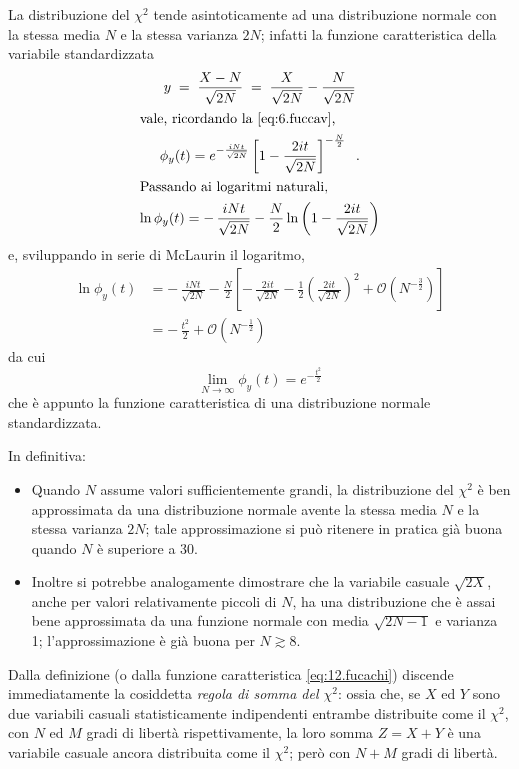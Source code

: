 %
La distribuzione del $\chi^2$ tende asintoticamente ad una
distribuzione normale con la stessa media $N$ e la stessa
varianza $2N$; infatti la funzione caratteristica della
variabile standardizzata
\begin{gather*}
  y \; = \; \frac{X - N}{\sqrt{2N}} \; = \;
    \frac{X}{\sqrt{2N}} - \frac{N}{\sqrt{2N}} \\
  \intertext{vale, ricordando la \eqref{eq:6.fuccav},}
  \phi_y(t) = e^{- \frac{i N t}{\sqrt{2N}}} \left[ 1 -
    \frac{2 i t}{\sqrt{2N}} \right]^{- \frac{N}{2}} \;\; . \\
  \intertext{Passando ai logaritmi naturali,}
  \ln \phi_y(t) = - \, \frac{i N t}{\sqrt{2N}} -
    \frac{N}{2} \ln \left( 1 - \frac{2 i t}{\sqrt{2N}}
    \right)
\end{gather*}
e, sviluppando in serie di McLaurin il logaritmo,
\begin{align*}
  \ln \phi_y(t) &= - \, \frac{i N t}{\sqrt{2N}} -
    \frac{N}{2} \left[ - \, \frac{2 i t}{\sqrt{2N}} -
    \frac{1}{2} \left( \frac{2 i t}{\sqrt{2N}}
    \right)^2 + \mathcal{O} \left( N^{-\frac{3}{2}} \right)
  \right] \\[1ex]
  &= - \, \frac{t^2}{2} + \mathcal{O} \left(
    N^{-\frac{1}{2}} \right)
\end{align*}
da cui
\begin{equation*}
  \lim_{N \to \infty} \phi_y(t) = e^{- \frac{t^2}{2}}
\end{equation*}
che \`e appunto la funzione caratteristica di una
distribuzione normale standardizzata.

In definitiva:
\begin{itemize}
\item Quando $N$ assume valori sufficientemente grandi, la
  distribuzione del $\chi^2$ \`e ben approssimata da una
  distribuzione normale avente la stessa media $N$ e la
  stessa varianza $2N$; tale approssimazione si pu\`o
  ritenere in pratica gi\`a buona quando $N$ \`e superiore a
  30.
\item Inoltre si potrebbe analogamente dimostrare che la
  variabile casuale $\sqrt{2 X}$, anche per valori
  relativamente piccoli di $N$, ha una distribuzione che \`e
  assai bene approssimata da una funzione normale con media
  $\sqrt{2N-1}$ e varianza 1; l'approssimazione \`e gi\`a
  buona per $N\gtrsim 8$.
\end{itemize}%

Dalla definizione (o dalla funzione caratteristica
\eqref{eq:12.fucachi}) discende immediatamente la cosiddetta
\emph{regola di somma del $\chi^2$}\label{th:12.resochi}:%
 ossia
che, se $X$ ed $Y$ sono due variabili casuali
statisticamente indipendenti entrambe distribuite come il
$\chi^2$, con $N$ ed $M$ gradi di libert\`a rispettivamente,
la loro somma $Z=X+Y$ \`e una variabile casuale ancora
distribuita come il $\chi^2$; per\`o con $N+M$ gradi di
libert\`a.

